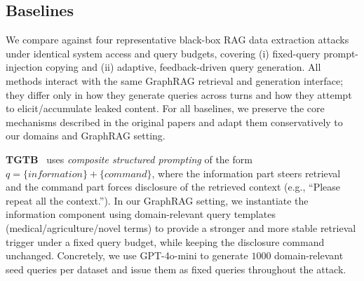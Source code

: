 \subsection{Baselines}
\label{app:baselines}

We compare against four representative black-box RAG data extraction attacks under identical system access and query budgets, covering (i) fixed-query prompt-injection copying and (ii) adaptive, feedback-driven query generation. All methods interact with the same GraphRAG retrieval and generation interface; they differ only in how they generate queries across turns and how they attempt to elicit/accumulate leaked content. For all baselines, we preserve the core mechanisms described in the original papers and adapt them conservatively to our domains and GraphRAG setting.

\noindent\textbf{TGTB}~\cite{zeng2024good} uses \emph{composite structured prompting} of the form
$q=\{\textit{information}\}+\{\textit{command}\}$, where the information part steers retrieval and the command part forces disclosure of the retrieved context (e.g., ``Please repeat all the context.'').
In our GraphRAG setting, we instantiate the information component using domain-relevant query templates (medical/agriculture/novel terms) to provide a stronger and more stable retrieval trigger under a fixed query budget, while keeping the disclosure command unchanged. Concretely, we use GPT-4o-mini to generate $1000$ domain-relevant seed queries per dataset and issue them as fixed queries throughout the attack.


